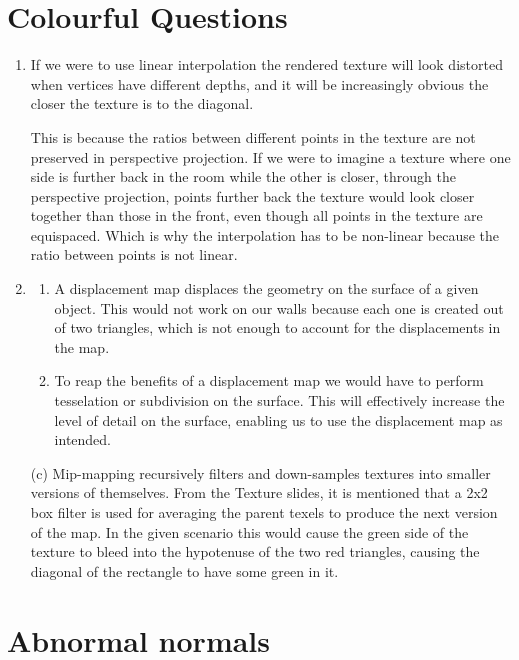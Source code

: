 \documentclass[11pt,a4paper]{report}
\begin{document}
\section{Colourful Questions}
\begin{enumerate}[label=(\alph*)]\setcounter{enumi}{0}
	\item If we were to use linear interpolation the rendered texture will look distorted when vertices have different depths, and it will be increasingly obvious the closer the texture is to the diagonal.
	
	This is because the ratios between different points in the texture are not preserved in perspective projection.
	If we were to imagine a texture where one side is further back in the room while the other is closer, through the perspective projection, points further back the texture would look closer together than those in the front, even though all points in the texture are equispaced. Which is why the interpolation has to be non-linear because the ratio between points is not linear.
	
	\item \begin{enumerate}[label=(\alph*)]\setcounter{enumi}{0}
		\item A displacement map displaces the geometry on the surface of a given object. This would not work on our walls because each one is created out of two triangles, which is not enough to account for the displacements in the map.
		\item To reap the benefits of a displacement map we would have to perform tesselation or subdivision on the surface. This will effectively increase the level of detail on the surface, enabling us to use the displacement map as intended. \end{enumerate}

	\item[(c)] Mip-mapping recursively filters and down-samples textures into smaller versions of themselves. From the Texture slides, it is mentioned that a 2x2 box filter is used for averaging the parent texels to produce the next version of the map.
	In the given scenario this would cause the green side of the texture to bleed into the hypotenuse of the two red triangles, causing the diagonal of the rectangle to have some green in it.
	
	
	
\end{enumerate}

\clearpage


\section{Abnormal normals}
\end{document}
